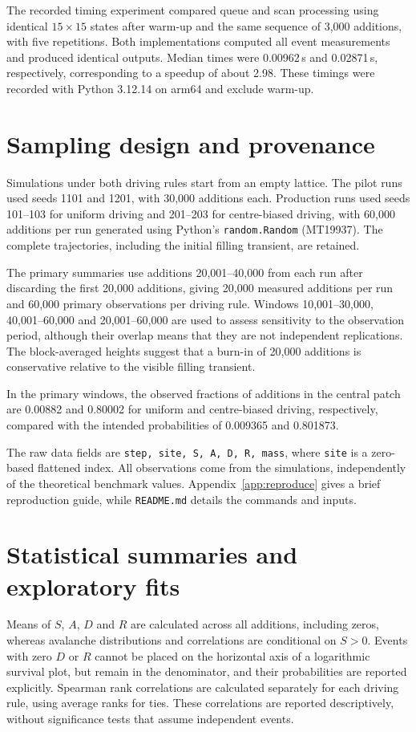 \documentclass[11pt,a4paper,oneside]{report}
\numberwithin{equation}{chapter}
\begin{document}
The recorded timing experiment compared queue and scan processing using identical $15\times15$ states after warm-up and the same sequence of 3,000 additions, with five repetitions. Both implementations computed all event measurements and produced identical outputs. Median times were 0.00962\,s and 0.02871\,s, respectively, corresponding to a speedup of about 2.98. These timings were recorded with Python 3.12.14 on arm64 and exclude warm-up.

\section{Sampling design and provenance}
\label{sec:sampling}
Simulations under both driving rules start from an empty lattice. The pilot runs used seeds 1101 and 1201, with 30,000 additions each. Production runs used seeds 101--103 for uniform driving and 201--203 for centre-biased driving, with 60,000 additions per run generated using Python's \texttt{random.Random} (MT19937). The complete trajectories, including the initial filling transient, are retained.

The primary summaries use additions 20,001--40,000 from each run after discarding the first 20,000 additions, giving 20,000 measured additions per run and 60,000 primary observations per driving rule. Windows 10,001--30,000, 40,001--60,000 and 20,001--60,000 are used to assess sensitivity to the observation period, although their overlap means that they are not independent replications. The block-averaged heights suggest that a burn-in of 20,000 additions is conservative relative to the visible filling transient.

\begin{samepage}
In the primary windows, the observed fractions of additions in the central patch are 0.00882 and 0.80002 for uniform and centre-biased driving, respectively, compared with the intended probabilities of 0.009365 and 0.801873.

The raw data fields are
\texttt{step, site, S, A, D, R, mass}, where \texttt{site} is a zero-based flattened index. All observations come from the simulations, independently of the theoretical benchmark values. Appendix~\ref{app:reproduce} gives a brief reproduction guide, while \texttt{README.md} details the commands and inputs.

\end{samepage}

\section{Statistical summaries and exploratory fits}
\label{sec:statistics}
Means of $S$, $A$, $D$ and $R$ are calculated across all additions, including zeros, whereas avalanche distributions and correlations are conditional on $S>0$. Events with zero $D$ or $R$ cannot be placed on the horizontal axis of a logarithmic survival plot, but remain in the denominator, and their probabilities are reported explicitly. Spearman rank correlations are calculated separately for each driving rule, using average ranks for ties. These correlations are reported descriptively, without significance tests that assume independent events.
\end{document}
